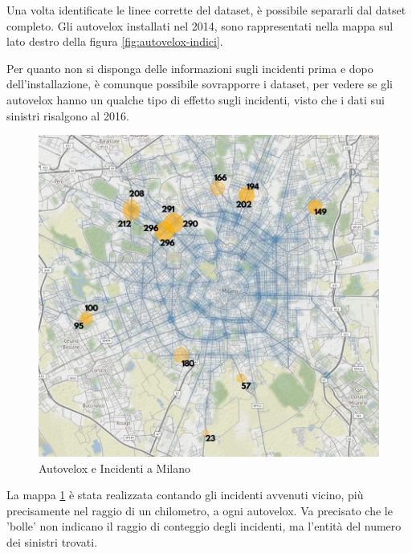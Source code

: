\documentclass[a4paper]{report}
\begin{document}
Una volta identificate le linee corrette del dataset, è possibile separarli dal datset completo.
Gli autovelox installati nel 2014, sono rappresentati nella mappa sul lato destro della 
figura \ref{fig:autovelox-indici}.

Per quanto non si disponga delle informazioni sugli incidenti prima e dopo dell'installazione, 
è comunque possibile sovrapporre i dataset, per vedere se gli autovelox hanno un qualche tipo di 
effetto sugli incidenti, visto che i dati sui sinistri risalgono al 2016.

\begin{figure}
    \includegraphics[width=\linewidth]{../src/autovelox/correlazione.png}
    \caption{Autovelox e Incidenti a Milano}
    \label{fig:autovelox-incidenti}
\end{figure}

La mappa \ref{fig:autovelox-incidenti} è stata realizzata contando gli incidenti avvenuti 
vicino, più precisamente nel raggio di un chilometro, a ogni autovelox.
Va precisato che le 'bolle' non indicano il raggio di conteggio degli incidenti, ma 
l'entità del numero dei sinistri trovati.
\end{document}
